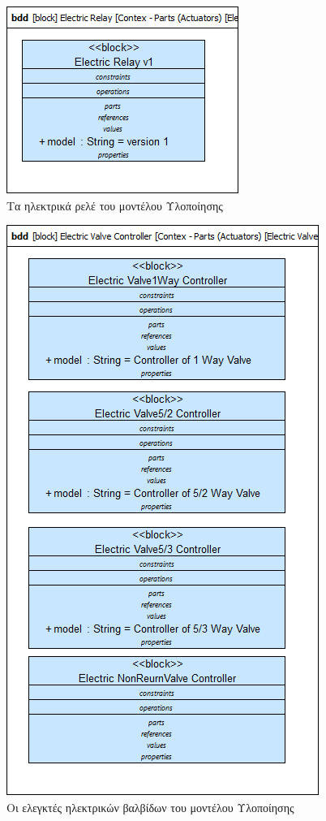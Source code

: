 \documentclass[a4paper,12pt,twoside]{report}
\begin{document}
\begin{appendices}
				\begin{figure}[hp]
					\centering
					\includegraphics[scale=0.50]{DesignModel_Contex-Parts(ActuatorUnits)[ElectricRelays].png}
					\caption{Τα ηλεκτρικά ρελέ του μοντέλου Υλοποίησης}
					\label{φωτ:Τα ηλεκτρικά ρελέ του μοντέλου Υλοποίησης}
				\end{figure}
				
				\begin{figure}[hp]
					\centering
					\includegraphics[scale=0.50]{DesignModel_Contex-Parts(ActuatorUnits)[ElectricValveControllers].png}
					\caption{Οι ελεγκτές ηλεκτρικών βαλβίδων του μοντέλου Υλοποίησης}
					\label{φωτ:Οι ελεγκτές ηλεκτρικών βαλβίδων του μοντέλου Υλοποίησης}
				\end{figure}
				

\end{appendices}
\end{document}
